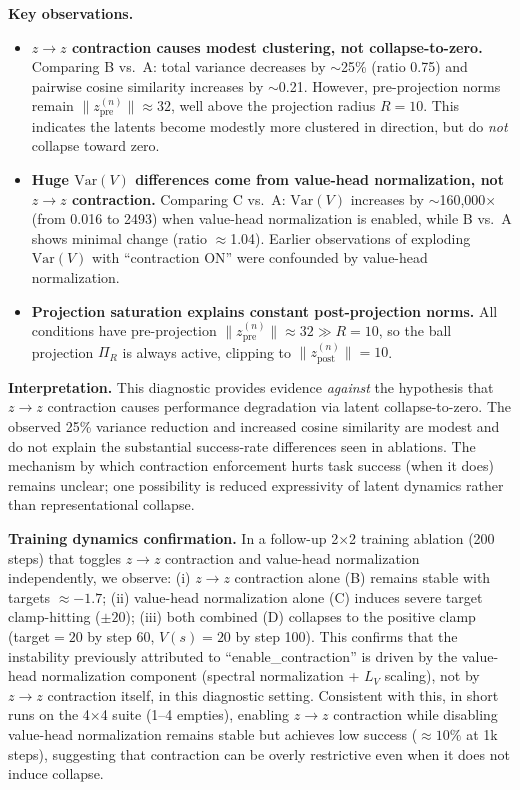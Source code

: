 \documentclass{article}
\theoremstyle{plain}
\theoremstyle{definition}
\theoremstyle{remark}
\begin{document}
\textbf{Key observations.}
\begin{itemize}
\item \textbf{$z\!\to\!z$ contraction causes modest clustering, not collapse-to-zero.}
Comparing B vs.\ A: total variance decreases by $\sim$25\% (ratio 0.75) and pairwise cosine similarity increases by $\sim$0.21.
However, pre-projection norms remain $\|z^{(n)}_{\text{pre}}\|\approx 32$, well above the projection radius $R{=}10$.
This indicates the latents become modestly more clustered in direction, but do \emph{not} collapse toward zero.
\item \textbf{Huge $\mathrm{Var}(V)$ differences come from value-head normalization, not $z\!\to\!z$ contraction.}
Comparing C vs.\ A: $\mathrm{Var}(V)$ increases by $\sim$160{,}000$\times$ (from 0.016 to 2493) when value-head normalization is enabled, while B vs.\ A shows minimal change (ratio $\approx$1.04).
Earlier observations of exploding $\mathrm{Var}(V)$ with ``contraction ON'' were confounded by value-head normalization.
\item \textbf{Projection saturation explains constant post-projection norms.}
All conditions have pre-projection $\|z^{(n)}_{\text{pre}}\|\approx 32 \gg R{=}10$, so the ball projection $\Pi_R$ is always active, clipping to $\|z^{(n)}_{\text{post}}\|=10$.
\end{itemize}

\textbf{Interpretation.}
This diagnostic provides evidence \emph{against} the hypothesis that $z\!\to\!z$ contraction causes performance degradation via latent collapse-to-zero.
The observed 25\% variance reduction and increased cosine similarity are modest and do not explain the substantial success-rate differences seen in ablations.
The mechanism by which contraction enforcement hurts task success (when it does) remains unclear; one possibility is reduced expressivity of latent dynamics rather than representational collapse.

\textbf{Training dynamics confirmation.}
In a follow-up 2$\times$2 training ablation (200 steps) that toggles $z\!\to\!z$ contraction and value-head normalization independently, we observe: (i) $z\!\to\!z$ contraction alone (B) remains stable with targets $\approx -1.7$; (ii) value-head normalization alone (C) induces severe target clamp-hitting ($\pm 20$); (iii) both combined (D) collapses to the positive clamp (target${}=20$ by step 60, $V(s)=20$ by step 100).
This confirms that the instability previously attributed to ``enable\_contraction'' is driven by the value-head normalization component (spectral normalization + $L_V$ scaling), not by $z\!\to\!z$ contraction itself, in this diagnostic setting.
Consistent with this, in short runs on the 4$\times$4 suite (1--4 empties), enabling $z\!\to\!z$ contraction while disabling value-head normalization remains stable but achieves low success (${\approx}10\%$ at 1k steps), suggesting that contraction can be overly restrictive even when it does not induce collapse.
\end{document}
